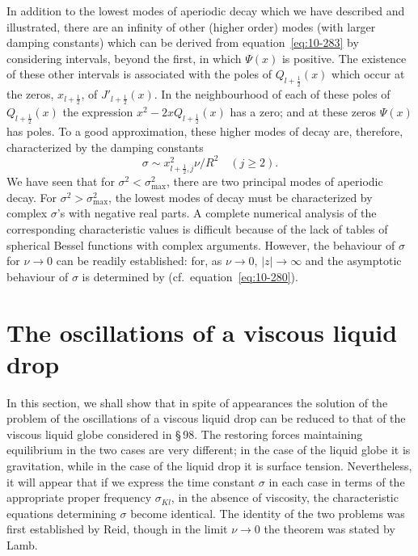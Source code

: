 In addition to the lowest modes of aperiodic decay which we have described and illustrated, there are an infinity of other (higher order) modes (with larger damping constants) which can be derived from equation~\eqref{eq:10-283} by considering intervals, beyond the first, in which $\Psi(x)$ is positive. The existence of these other intervals is associated with the poles of $Q_{l+\frac{1}{2}}(x)$ which occur at the zeros, $x_{l+\frac{1}{2}}$, of $J'_{l+\frac{1}{2}}(x)$. In the neighbourhood of each of these poles of $Q_{l+\frac{1}{2}}(x)$ the expression $x^2-2xQ_{l+\frac{1}{2}}(x)$ has a zero; and at these zeros $\Psi(x)$ has poles. To a good approximation, these higher modes of decay are, therefore, characterized by the damping constants
\begin{equation}
\label{eq:10-288}
\sigma \sim x_{l+\frac{1}{2},j}^2\nu/R^2 \quad (j \geqslant 2).
\end{equation}
We have seen that for $\sigma^2 < \sigma_{\max}^2$, there are two principal modes of aperiodic decay. For $\sigma^2 > \sigma_{\max}^2$, the lowest modes of decay must be characterized by complex $\sigma$'s with negative real parts. A complete numerical analysis of the corresponding characteristic values is difficult because of the lack of tables of spherical Bessel functions with complex arguments. However, the behaviour of $\sigma$ for $\nu \to 0$ can be readily established: for, as $\nu \to 0$, $|z| \to \infty$ and the asymptotic behaviour of $\sigma$ is determined by (cf.\ equation~\eqref{eq:10-280}).

\section{The oscillations of a viscous liquid drop}\label{sec:99}

In this section, we shall show that in spite of appearances the solution of the problem of the oscillations of a viscous liquid drop can be reduced to that of the viscous liquid globe considered in \S\,98. The restoring forces maintaining equilibrium in the two cases are very different; in the case of the liquid globe it is gravitation, while in the case of the liquid drop it is surface tension. Nevertheless, it will appear that if we express the time constant $\sigma$ in each case in terms of the appropriate proper frequency $\sigma_{Kl}$, in the absence of viscosity, the characteristic equations determining $\sigma$ become identical. The identity of the two problems was first established by Reid, though in the limit $\nu \to 0$ the theorem was stated by Lamb.

